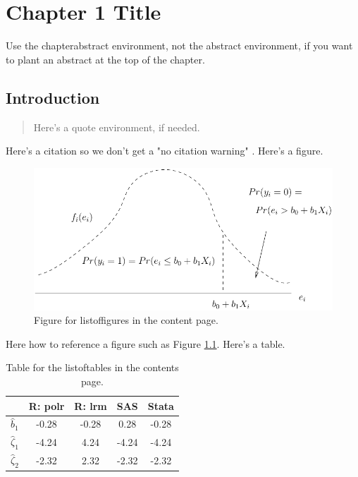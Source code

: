 \chapter{Chapter 1 Title}

\begin{chapterabstract}
    Use the chapterabstract environment, not the abstract environment, if you want to plant an abstract at the top of the chapter.
\end{chapterabstract}

\section{Introduction}

\begin{quote}
   Here's a quote environment, if needed.
\end{quote}
Here's a citation so we don't get a "no citation warning" \cite{GolV13}.
Here's a figure. 
\begin{figure}
    \begin{centering}
        \includegraphics[scale=0.8]{chap_1/chap_1_figures/example_1.pdf}
    \par\end{centering}
    \caption{Figure for listoffigures  in the content page.}
    \label{fig:first_fig}
\end{figure}
Here how to reference a figure such as Figure \ref{fig:first_fig}.
\newpage
Here's a table.
\begin{table}
    \centering{}
    \begin{tabular}{|c|c|c|c|c|}
        \hline 
            & R: polr & R: lrm & SAS & Stata\tabularnewline
        \hline 
        \hline 
        $\hat{b}_{1}$ & -0.28 & -0.28 & 0.28 & -0.28\tabularnewline
        \hline 
        $\hat{\zeta}_{1}$ & -4.24 & 4.24 & -4.24 & -4.24\tabularnewline
        \hline 
        $\hat{\zeta}_{2}$ & -2.32 & 2.32 & -2.32 & -2.32\tabularnewline
        \hline 
    \end{tabular}
    \caption{Table for the listoftables in the contents page.}
    \label{tab:random_table}
\end{table}